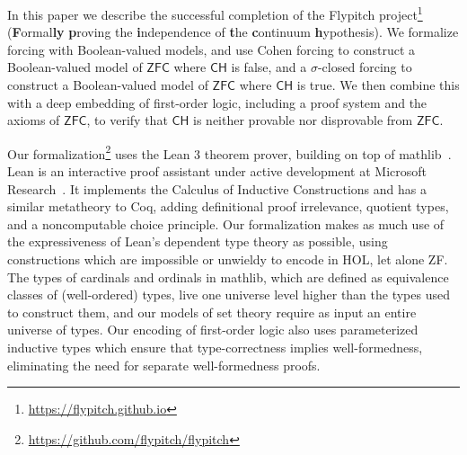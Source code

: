 \documentclass[sigplan,10pt,review, anonymous]{acmart}
\newcommand{\ZFC}{\mathsf{ZFC}}
\newcommand{\CH}{\mathsf{CH}}
\theoremstyle{definition}
\begin{document}
In this paper we describe the successful completion of the Flypitch project\footnote{\url{https://flypitch.github.io}} (\textbf{F}ormal\textbf{ly} \textbf{p}roving the \textbf{i}ndependence of \textbf{t}he \textbf{c}ontinuum \textbf{h}ypothesis).
We formalize forcing with Boolean-valued models, and use Cohen forcing to construct a Boolean-valued model of \(\ZFC\) where \(\CH\) is false, and a \(\sigma\)-closed forcing to construct a Boolean-valued model of \(\ZFC\) where \(\CH\) is true. We then combine this with a deep embedding of first-order logic, including a proof system and the axioms of \(\ZFC\), to verify that \(\CH\) is neither provable nor disprovable from \(\ZFC\).

Our formalization\footnote{\url{https://github.com/flypitch/flypitch}} uses the Lean 3 theorem prover, building on top of \textsf{mathlib}~\cite{mathlib}. %
Lean is an interactive proof assistant under active development at Microsoft Research~\cite{de2015lean, ullrich2019counting}.
It implements the Calculus of Inductive Constructions and has a similar metatheory to Coq, adding definitional proof irrelevance, quotient types, and a noncomputable choice principle.
Our formalization makes as much use of the expressiveness of Lean's dependent type theory as possible, using constructions which are impossible or unwieldy to encode in HOL, let alone ZF.
The types of cardinals and ordinals in \textsf{mathlib}, which are defined as equivalence classes of (well-ordered) types, live one universe level higher than the types used to construct them, and our models of set theory require as input an entire universe of types. Our encoding of first-order logic also uses parameterized inductive types which ensure that type-correctness implies well-formedness, eliminating the need for separate well-formedness proofs.

\end{document}
